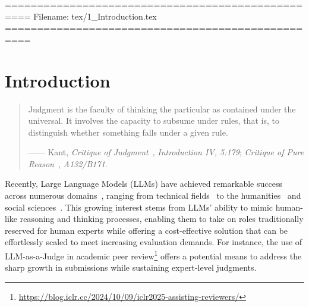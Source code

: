 ==================================================
Filename: tex/1_Introduction.tex
==================================================
\clearpage

\section{Introduction}\label{sec:introduction}


\begin{quote}
\textsf{Judgment is the faculty of thinking the particular as contained under the universal.  
It involves the capacity to subsume under rules, that is, to distinguish whether something falls under a given rule.}  
\begin{flushright}
\footnotesize ------ Kant, \textit{Critique of Judgment}~\citep{kant1790cj}, \textit{Introduction IV, 5:179}; \textit{Critique of Pure Reason}~\citep{kant1781cpr}, \textit{A132/B171}.
\end{flushright}
\end{quote}



Recently, Large Language Models (LLMs) have achieved remarkable success across numerous domains~\cite{inno_new_world}, ranging from technical fields~\cite{inno_aigeo_zhao2024artificial,inno_medicine_tang2024llms,inno_life_science_yuan2023advanced} to the humanities~\cite{inno_cognitive_qu2024promoting,inno_life_science_luo2024artificial,inno_cancer_zhong2023artificial,inno_proteins} and social sciences~\cite{nature_personality_wang2025,inno_science_xu2023artificial,inno_paper_he2023chatgpt,inno_drug_shi2024drug}.  
This growing interest stems from LLMs' ability to mimic human-like reasoning and thinking processes, enabling them to take on roles traditionally reserved for human experts while offering a cost-effective solution that can be effortlessly scaled to meet increasing evaluation demands.
For instance, the use of LLM-as-a-Judge in academic peer review\footnote{\url{https://blog.iclr.cc/2024/10/09/iclr2025-assisting-reviewers/}}  offers a potential means to address the sharp growth in submissions while sustaining expert-level judgments.

